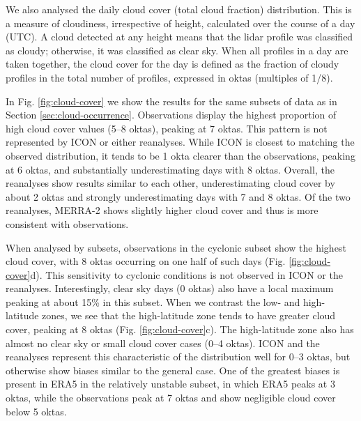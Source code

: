 \documentclass[12pt,a4paper]{article}
\begin{document}
We also analysed the daily cloud cover (total cloud fraction) distribution. This is
a measure of cloudiness, irrespective of height, calculated over the course of
a day (UTC). A cloud detected at any height means that the lidar profile was
classified as cloudy; otherwise, it was classified as clear sky. When all
profiles in a day are taken together, the cloud cover for the day is defined as
the fraction of cloudy profiles in the total number of profiles, expressed in
oktas (multiples of 1/8).

In Fig.  \ref{fig:cloud-cover} we show the results for the same subsets of data
as in Section \ref{sec:cloud-occurrence}. Observations display the highest proportion of
high cloud cover values (5--8 oktas), peaking at 7 oktas. This pattern is not represented by
ICON or either reanalyses.  While ICON is closest to matching the observed distribution, it tends to be 1 okta
clearer than the observations, peaking at 6 oktas, and substantially underestimating
days with 8 oktas.  Overall, the reanalyses show results similar to each other,
underestimating cloud cover by about 2 oktas and strongly underestimating days
with 7 and 8 oktas. Of the two reanalyses, MERRA-2 shows slightly higher cloud
cover and thus is more consistent with observations.

When analysed by subsets, observations in the cyclonic subset show the highest
cloud cover, with 8 oktas occurring on one half of such days (Fig.
\ref{fig:cloud-cover}d).  This sensitivity to cyclonic conditions is not observed in ICON or the reanalyses. Interestingly, clear sky days (0 oktas) also have a local maximum peaking
at about 15\% in this subset.  When we contrast the low- and high-latitude
zones, we see that the high-latitude zone tends to have greater cloud cover,
peaking at 8 oktas (Fig.  \ref{fig:cloud-cover}c). The high-latitude zone also
has almost no clear sky or small cloud cover cases (0--4 oktas). ICON and the
reanalyses represent this characteristic of the distribution well for
0--3 oktas, but otherwise show biases similar to the general case. One of the
greatest biases is present in ERA5 in the relatively unstable subset, in which
ERA5 peaks at 3 oktas, while the observations peak at 7 oktas and show
negligible cloud cover below 5 oktas.
\end{document}
